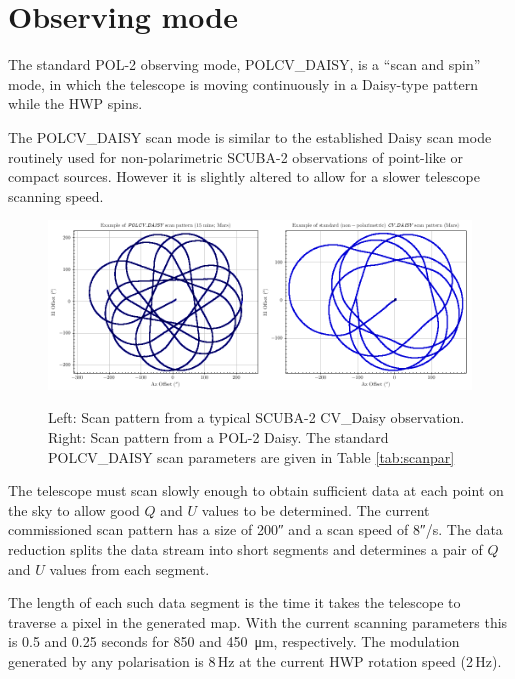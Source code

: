 \section{Observing mode}
\label{sec:mmodes}

The standard POL-2 observing mode, POLCV\_DAISY, is a “scan and spin”
mode, in which the telescope is moving continuously in a Daisy-type
pattern while the HWP spins.

The POLCV\_DAISY scan mode is similar to the established Daisy scan
mode routinely used for non-polarimetric SCUBA-2 observations of
point-like or compact sources. However it is slightly altered to allow
for a slower telescope scanning speed.


\begin{figure}[t!]
\begin{center}
\includegraphics[width=0.9\linewidth]{scan_pattern_daisy_comparison.png}
\label{fig:scancompsrison}
\caption [Scan Pattern Comparison]{Left: Scan pattern from a typical
  SCUBA-2 CV\_Daisy observation. Right: Scan pattern from a POL-2
  Daisy. The standard POLCV\_DAISY scan parameters are given in Table
  \ref{tab:scanpar} }
\end{center}
\end{figure}


The telescope must scan slowly enough to obtain sufficient data at
each point on the sky to allow good $Q$ and $U$ values to be
determined. The current commissioned scan pattern has a size of
200\si{\arcsecond} and a scan speed of 8\si{\arcsecond}/s. The data
reduction splits the data stream into short segments and determines a
pair of $Q$ and $U$ values from each segment.

The length of each such data segment is the time it takes the
telescope to traverse a pixel in the generated map. With the current
scanning parameters this is 0.5 and 0.25 seconds for 850 and
\SI{450}{\micro\metre}, respectively. The modulation generated by any
polarisation is 8\,Hz at the current HWP rotation speed (2\,Hz).

